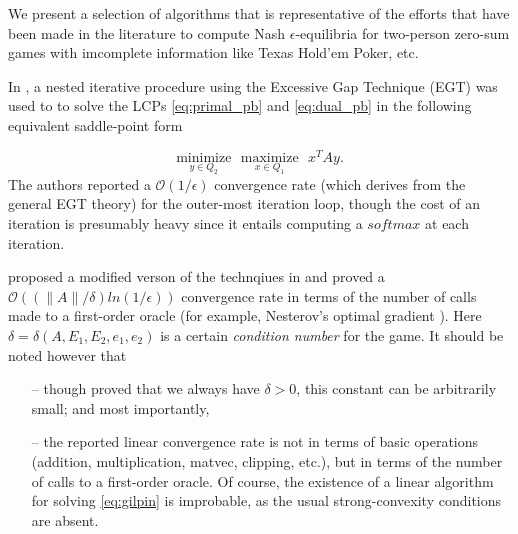 \documentclass[envcountsame]{llcns2e/llncs}
\begin{document}
We present a selection of algorithms that is representative of the
efforts that have been made in the literature to compute Nash
$\epsilon$-equilibria for two-person zero-sum games with imcomplete
information like Texas Hold'em Poker, etc.


In \cite{hoda2010smoothing}, a nested iterative procedure using the
Excessive Gap Technique (EGT) \cite{nesterov2005excessive} was used to
to solve the LCPs \eqref{eq:primal_pb} and \eqref{eq:dual_pb} in the
following equivalent saddle-point form


\begin{equation}
  \underset{y \in Q_2}{\text{minimize}}\text{ }\underset{x \in
    Q_1}{\text{maximize}}\text{ }x^TAy.
  \label{eq:gilpin}
\end{equation}
The authors reported a $\mathcal{O}(1/\epsilon)$ convergence rate
(which derives from the general EGT theory) for the outer-most
iteration loop, though the cost of an iteration is presumably heavy
since it entails computing a $softmax$ at each iteration.


\cite{gilpinfirst} proposed a modified verson of the technqiues in
\cite{hoda2010smoothing} and  proved a $\mathcal{O}\left(\left(\|A\| /
\delta\right) ln\left(1 / \epsilon\right)\right)$ convergence rate in
terms of the number of calls made to a first-order oracle (for
example, Nesterov's optimal gradient \cite{nesterov1983}). Here
$\delta = \delta(A, E_1, E_2, e_1, e_2)$ is a certain
\textit{condition number} for the game. It should be noted however that
\begin{itemize}
\item[--] though \cite{gilpinfirst} proved that we always have $\delta
  > 0$, this constant can be arbitrarily small; and most importantly,
\item[--] the reported linear convergence rate is not in terms of
  basic operations (addition, multiplication, matvec, clipping, etc.),
  but in terms of the number of calls to a first-order oracle. Of
  course, the existence of a linear algorithm for solving
  \eqref{eq:gilpin} is improbable, as the usual strong-convexity
  conditions are absent.

\end{itemize}

\end{document}
